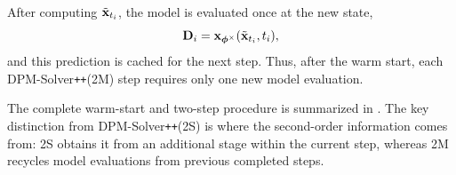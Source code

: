 After computing $\tilde{{\mathbf{x}}}_{t_i}$, the model is evaluated once at the new
state,
\[
{\mathbf{D}}_i
=
{\mathbf{x}}_{\bm{\phi}^\times}
(\tilde{{\mathbf{x}}}_{t_i},t_i),
\]
and this prediction is cached for the next step. Thus, after the warm start,
each DPM-Solver\texttt{++}(2M) step requires only one new model evaluation.


The complete warm-start and two-step procedure is summarized in
. The key distinction from
DPM-Solver\texttt{++}(2S) is where the second-order information comes from:
2S obtains it from an additional stage within the current step, whereas 2M
recycles model evaluations from previous completed steps.


